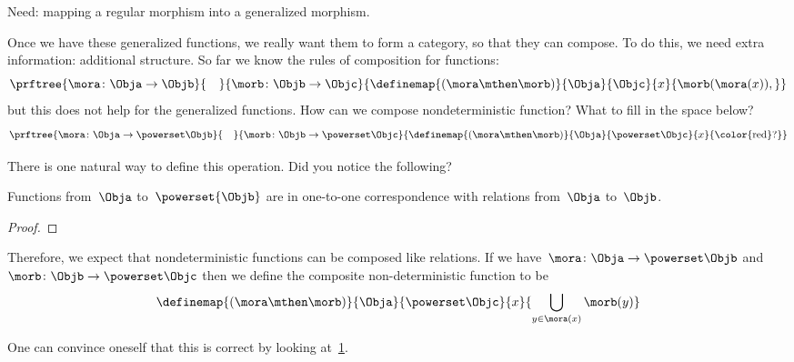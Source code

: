 Need: mapping a regular morphism into a generalized morphism.

Once we have these generalized functions, we really want them to form a category, so that they can compose.
To do this, we need extra information: additional structure.
So far we know the rules of composition for functions:
%
\begin{equation}
    \label{eq:monad-function-composition}
    \prftree{\mora\colon \Obja \to \Objb}{\quad}{\morb\colon \Objb \to \Objc}
    {\definemap{(\mora\mthen\morb)}{\Obja}{\Objc}%
    {x}{\morb(\mora(x)),}}
\end{equation}
%
but this does not help for the generalized functions.
How can we compose nondeterministic function? What to fill in the space below?
%
\begin{equation}
    \label{eq:monad-gen-function-composition}
    \prftree{\mora\colon \Obja \to \powerset\Objb}{\quad}{\morb\colon \Objb \to \powerset \Objc}
    {\definemap{(\mora\mthen\morb)}{\Obja}{\powerset\Objc}%
    {x}{\text{\color{red}?}}}
\end{equation}

There is one natural way to define this operation.
Did you notice the following?

\begin{lemma}
    \label{lem:powersets-relations}
    Functions from~$\Obja$ to~$\powerset{\Objb}$ are in one-to-one correspondence with relations from~$\Obja$ to~$\Objb$.
\end{lemma}

\begin{proof}
\end{proof}

Therefore, we expect that nondeterministic functions can be composed like relations.
If we have~$\mora\colon \Obja \to \powerset\Objb$ and~$\morb\colon \Objb \to \powerset \Objc$ then we define the composite non-deterministic function to be
%
\begin{equation}
    \label{eq:fish-nondet}
    \definemap{(\mora\mthen\morb)}{\Obja}{\powerset\Objc}%
    {x}{ \displaystyle \bigcup_{y\in \mora(x)}\morb(y)}
\end{equation}

One can convince oneself that this is correct by looking at~\cref{fig:mapping-nondeterministic}.

\begin{figure}[h]
    \caption{}
    \label{fig:mapping-nondeterministic}
\end{figure}

